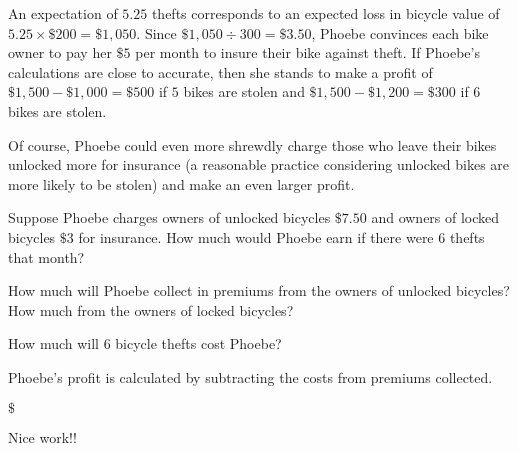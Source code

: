 \documentclass{ximera}
\begin{document}
An expectation of $5.25$ thefts corresponds to an expected loss in bicycle value of $5.25\times\$200=\$1,050$. Since $\$1,050\div 300=\$3.50$, Phoebe convinces each bike owner to pay her $\$5$ per month to insure their bike against theft. If Phoebe's calculations are close to accurate, then she stands to make a profit of $\$1,500-\$1,000=\$500$ if $5$ bikes are stolen and $\$1,500-\$1,200=\$300$ if $6$ bikes are stolen.

Of course, Phoebe could even more shrewdly charge those who leave their bikes unlocked more for insurance (a reasonable practice considering unlocked bikes are more likely to be stolen) and make an even larger profit.


\begin{question}
Suppose Phoebe charges owners of unlocked bicycles $\$7.50$ and owners of locked bicycles $\$3$ for insurance. How much would Phoebe earn if there were $6$ thefts that month?
\begin{solution}
\begin{hint}
How much will Phoebe collect in premiums from the owners of unlocked bicycles? How much from the owners of locked bicycles?
\end{hint}
\begin{hint}
How much will $6$ bicycle thefts cost Phoebe?
\end{hint}
\begin{hint}
Phoebe's profit is calculated by subtracting the costs from premiums collected.
\end{hint}
$\$$
\end{solution}
Nice work!!
\end{question}
\end{document}
